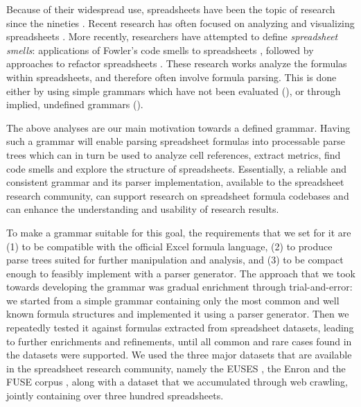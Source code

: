 \documentclass[times]{smrauth}
\begin{document}
Because of their widespread use, spreadsheets have been the topic of research since the nineties \cite{DBLP:journals/sigplan/BellP93}. Recent research has often focused on analyzing and visualizing spreadsheets \cite{DBLP:conf/icse/HermansPD11, Shio1999}. More recently, researchers have attempted to define \emph{spreadsheet smells}: applications of Fowler's code smells to spreadsheets \cite{DBLP:conf/icse/HermansPD12, DBLP:conf/icsm/Hermans212}, followed by approaches to refactor spreadsheets \cite{hermans2014bumblebee,badame2012refactoring}. These research works analyze the formulas within spreadsheets, and therefore often involve formula parsing. This is done either by using simple grammars which have not been evaluated (\cite{badame2012refactoring}), or through implied, undefined grammars (\cite{DBLP:conf/icse/HermansPD11,DBLP:conf/icse/HermansPD12, DBLP:conf/icsm/Hermans212, hermans2014bumblebee}). 

The above analyses are our main motivation towards a defined grammar. Having such a grammar will enable parsing spreadsheet formulas into processable parse trees which can in turn be used to analyze cell references, extract metrics, find code smells and explore the structure of spreadsheets. Essentially, a reliable and consistent grammar and its parser implementation, available to the spreadsheet research community, can support research on spreadsheet formula codebases and can enhance the understanding and usability of research results.

To make a grammar suitable for this goal, the requirements that we set for it are (1) to be compatible with the official Excel formula language, (2) to produce parse trees suited for further manipulation and analysis, and (3) to be compact enough to feasibly implement with a parser generator. The approach that we took towards developing the grammar was gradual enrichment through trial-and-error: we started from a simple grammar containing only the most common and well known formula structures and implemented it using a parser generator. Then we repeatedly tested it against formulas extracted from spreadsheet datasets, leading to further enrichments and refinements, until all common and rare cases found in the datasets were supported.
We used the three major datasets that are available in the spreadsheet research community, namely the EUSES \cite{euses}, the Enron \cite{enron} and the FUSE corpus \cite{fuse}, along with a dataset that we accumulated through web crawling, jointly containing over three hundred spreadsheets.
\end{document}
